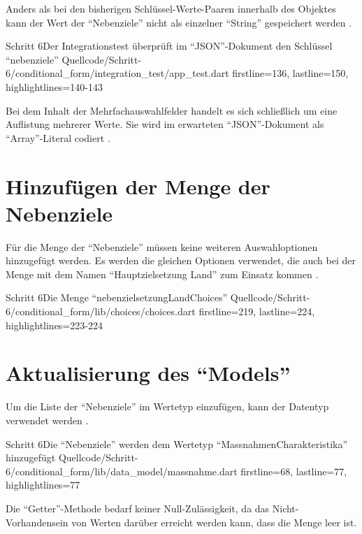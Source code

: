 Anders als bei den bisherigen Schlüssel-Werte-Paaren innerhalb des Objektes  kann der Wert der \enquote{Nebenziele} nicht als einzelner \enquote{String} gespeichert werden \Lst{\ref{lst:Schritt6expectedJson}}.

\begin{alexlisting}{Schritt 6}{Der Integrationstest überprüft im \enquote{JSON}-Dokument den Schlüssel \enquote{nebenziele}}
  {Quellcode/Schritt-6/conditional_form/integration_test/app_test.dart}
  {firstline=136, lastline=150, highlightlines={140-143}}
  \label{lst:Schritt6expectedJson}
\end{alexlisting}

Bei dem Inhalt der Mehrfachauswahlfelder handelt es sich schließlich um eine Auflistung mehrerer Werte.
Sie wird im erwarteten \enquote{JSON}-Dokument als \enquote{Array}-Literal codiert .



\section{Hinzufügen der Menge der Nebenziele}

Für die Menge der \enquote{Nebenziele} müssen keine weiteren Auswahloptionen hinzugefügt werden.
Es werden die gleichen Optionen verwendet,
die auch bei der Menge  mit dem Namen \enquote{Hauptzielsetzung Land} zum Einsatz kommen .

\begin{alexlisting}{Schritt 6}{Die Menge \enquote{nebenzielsetzungLandChoices}}
  {Quellcode/Schritt-6/conditional_form/lib/choices/choices.dart}
  {firstline=219, lastline=224, highlightlines={223-224}}
  \label{lst:Schritt6nebenzielsetzungLandChoices}
\end{alexlisting}

\section{Aktualisierung des \enquote{Models}}

Um die Liste der \enquote{Nebenziele} im Wertetyp  einzufügen,
kann der Datentyp  verwendet werden .
\begin{alexlisting}{Schritt 6}{Die \enquote{Nebenziele} werden dem Wertetyp \enquote{MassnahmenCharakteristika} hinzugefügt}
  {Quellcode/Schritt-6/conditional_form/lib/data_model/massnahme.dart}
  {firstline=68, lastline=77, highlightlines={77}}
  \label{lst:Schritt6MassnahmenCharakteristika}
\end{alexlisting}
Die \enquote{Getter}-Methode  bedarf keiner Null-Zulässigkeit,
da das Nicht-Vorhandensein von Werten darüber erreicht werden kann,
dass die Menge leer ist.




